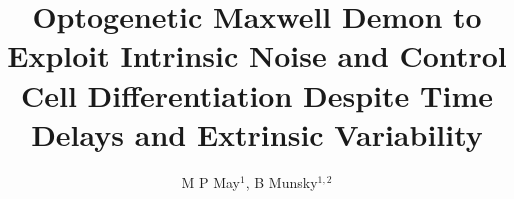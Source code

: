 \documentclass[12pt]{article}
\begin{document}
\title{Optogenetic Maxwell Demon to Exploit Intrinsic Noise and Control Cell Differentiation Despite Time Delays and Extrinsic Variability}
\maketitle

\author{M P May$^1$, B Munsky$^{1,2}$}


\end{document}
